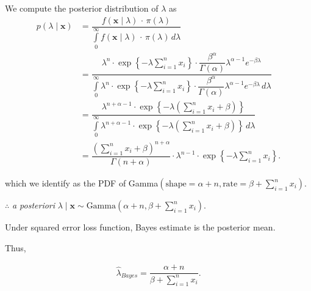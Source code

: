 \documentclass[12pt, a4paper]{article}
\begin{document}
We compute the posterior distribution of $\lambda$ as
\begin{align*}
p(\lambda \mid \mathbf{x}) &= \dfrac{f(\mathbf{x} \mid \lambda) \, \cdot \, \pi(\lambda)}{\displaystyle \int\limits_{0}^{\infty} f(\mathbf{x} \mid \lambda) \, \cdot \, \pi(\lambda) \, d\lambda} \\[1em]
&= \dfrac{\lambda^n \cdot \exp \left\{ - \lambda \sum \limits_{i = 1}^{n} x_i \right\} \cdot \dfrac{\beta^\alpha}{\Gamma(\alpha)} \lambda^{\alpha-1}e^{-\beta\lambda}}{\displaystyle{\int \limits_{0}^{\infty} \lambda^n \cdot \exp \left\{ - \lambda \sum \limits_{i = 1}^{n} x_i \right\}} \cdot \dfrac{\beta^\alpha}{\Gamma(\alpha)} \lambda^{\alpha-1}e^{-\beta\lambda} \, d\lambda} \\[1em]
&= \dfrac{\lambda^{n + \alpha - 1} \cdot \exp \left\{ - \lambda \left(\sum \limits_{i = 1}^{n} x_i + \beta \right) \right\}}{\displaystyle{\int \limits_{0}^{\infty} \lambda^{n + \alpha - 1} \cdot \exp \left\{ - \lambda \left(\sum \limits_{i = 1}^{n} x_i + \beta \right) \right\} \, d\lambda}} \\[1em]
&= \dfrac{\left( \sum \limits_{i = 1}^{n} x_i + \beta \right)^{n + \alpha}}{\Gamma(n + \alpha)} \cdot \lambda^{n-1} \cdot \exp \left\{ - \lambda \sum \limits_{i = 1}^{n} x_i \right\}.
\end{align*}

which we identify as the PDF of Gamma$\left(\text{shape} = \alpha + n, \text{rate} = \beta + \sum \limits_{i = 1}^{n} x_i \right)$.

\vspace{0.5cm}

$\therefore$ \textit{a posteriori} $\lambda \mid \mathbf{x} \sim \text{Gamma}\left(\alpha + n, \beta + \sum \limits_{i = 1}^{n} x_i \right)$.

\vspace{0.5cm}

{\fontsize{12}{20} \gloriahallelujahfont Under squared error loss function, Bayes estimate is the posterior mean.}

\vspace{0.5cm}

Thus,

\begin{align*}
\hat{\lambda}_{Bayes} = \dfrac{\alpha + n}{\beta + \sum \limits_{i = 1}^{n}  x_i}.
\end{align*}
\end{document}

